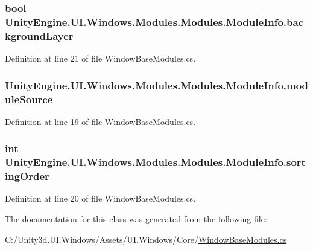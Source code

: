 \subsubsection[{background\+Layer}]{\setlength{\rightskip}{0pt plus 5cm}bool Unity\+Engine.\+U\+I.\+Windows.\+Modules.\+Modules.\+Module\+Info.\+background\+Layer}\label{class_unity_engine_1_1_u_i_1_1_windows_1_1_modules_1_1_modules_1_1_module_info_a997a22798767e512e30ac707b2e29d8e}


Definition at line 21 of file Window\+Base\+Modules.\+cs.

\hypertarget{class_unity_engine_1_1_u_i_1_1_windows_1_1_modules_1_1_modules_1_1_module_info_ab543422b01bdef66c2fe6c7e04f20b82}{}
\subsubsection[{module\+Source}]{ Unity\+Engine.\+U\+I.\+Windows.\+Modules.\+Modules.\+Module\+Info.\+module\+Source}\label{class_unity_engine_1_1_u_i_1_1_windows_1_1_modules_1_1_modules_1_1_module_info_ab543422b01bdef66c2fe6c7e04f20b82}


Definition at line 19 of file Window\+Base\+Modules.\+cs.

\hypertarget{class_unity_engine_1_1_u_i_1_1_windows_1_1_modules_1_1_modules_1_1_module_info_aa90a6cca9d59559107ed05065efc2f34}{}
\subsubsection[{sorting\+Order}]{\setlength{\rightskip}{0pt plus 5cm}int Unity\+Engine.\+U\+I.\+Windows.\+Modules.\+Modules.\+Module\+Info.\+sorting\+Order}\label{class_unity_engine_1_1_u_i_1_1_windows_1_1_modules_1_1_modules_1_1_module_info_aa90a6cca9d59559107ed05065efc2f34}


Definition at line 20 of file Window\+Base\+Modules.\+cs.



The documentation for this class was generated from the following file\+:\begin{DoxyCompactItemize}
\item 
C\+:/\+Unity3d.\+U\+I.\+Windows/\+Assets/\+U\+I.\+Windows/\+Core/\hyperlink{_window_base_modules_8cs}{Window\+Base\+Modules.\+cs}\end{DoxyCompactItemize}
